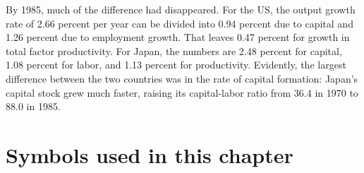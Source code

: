 \begin{enumerate}
By 1985, much of the difference had disappeared.
For the US, the output growth rate of 2.66 percent per year can be divided
into 0.94 percent due to capital and 1.26 percent due to employment growth.
That leaves 0.47 percent for growth in total factor productivity.
For Japan, the numbers are 2.48 percent for capital, 1.08 percent for
labor, and 1.13 percent for productivity.
Evidently, the largest difference between the two
countries was in the rate of capital formation:  Japan's capital stock
grew much faster, raising its capital-labor ratio from
36.4 in 1970 to 88.0 in 1985.
\end{enumerate}
\setlength{\leftmargini}{\oldleftmargini}

\section*{Symbols used in this chapter}

